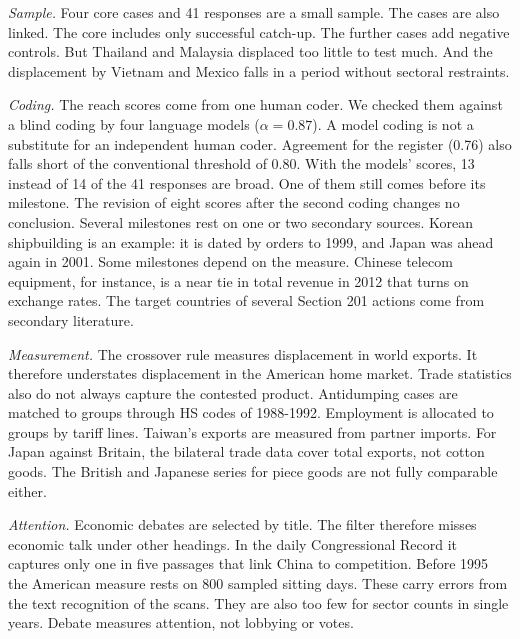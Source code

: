 \documentclass[review,authoryear,12pt]{elsarticle}
\begin{document}
\emph{Sample.} Four core cases and 41 responses are a small sample. The cases are also linked. The core includes only successful catch-up. The further cases add negative controls. But Thailand and Malaysia displaced too little to test much. And the displacement by Vietnam and Mexico falls in a period without sectoral restraints.

\emph{Coding.} The reach scores come from one human coder. We checked them against a blind coding by four language models ($\alpha=0.87$). A model coding is not a substitute for an independent human coder. Agreement for the register (0.76) also falls short of the conventional threshold of 0.80. With the models' scores, 13 instead of 14 of the 41 responses are broad. One of them still comes before its milestone. The revision of eight scores after the second coding changes no conclusion. Several milestones rest on one or two secondary sources. Korean shipbuilding is an example: it is dated by orders to 1999, and Japan was ahead again in 2001. Some milestones depend on the measure. Chinese telecom equipment, for instance, is a near tie in total revenue in 2012 that turns on exchange rates. The target countries of several Section 201 actions come from secondary literature.

\emph{Measurement.} The crossover rule measures displacement in world exports. It therefore understates displacement in the American home market. Trade statistics also do not always capture the contested product. Antidumping cases are matched to groups through HS codes of 1988-1992. Employment is allocated to groups by tariff lines. Taiwan's exports are measured from partner imports. For Japan against Britain, the bilateral trade data cover total exports, not cotton goods. The British and Japanese series for piece goods are not fully comparable either.

\emph{Attention.} Economic debates are selected by title. The filter therefore misses economic talk under other headings. In the daily Congressional Record it captures only one in five passages that link China to competition. Before 1995 the American measure rests on 800 sampled sitting days. These carry errors from the text recognition of the scans. They are also too few for sector counts in single years. Debate measures attention, not lobbying or votes.
\end{document}
